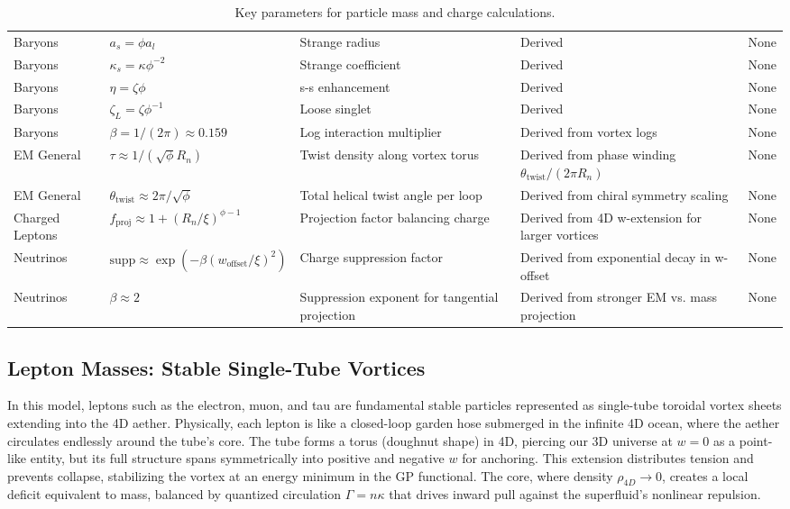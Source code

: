 \documentclass{article}
\begin{document}
\begin{sidewaystable}[p]
\begin{tabular}{|p{2cm}|p{3cm}|p{6cm}|p{6cm}|p{3cm}|}
Baryons & $a_s = \phi a_l$ & Strange radius & Derived & None \\
Baryons & $\kappa_s = \kappa \phi^{-2}$ & Strange coefficient & Derived & None \\
Baryons & $\eta = \zeta \phi$ & s-s enhancement & Derived & None \\
Baryons & $\zeta_L = \zeta \phi^{-1}$ & Loose singlet & Derived & None \\
Baryons & $\beta = 1/(2\pi) \approx 0.159$ & Log interaction multiplier & Derived from vortex logs & None \\
EM General & $\tau \approx 1 / (\sqrt{\phi} R_n)$ & Twist density along vortex torus & Derived from phase winding $\theta_{\text{twist}} / (2\pi R_n)$ & None \\
EM General & $\theta_{\text{twist}} \approx 2\pi / \sqrt{\phi}$ & Total helical twist angle per loop & Derived from chiral symmetry scaling & None \\
Charged Leptons & $f_{\text{proj}} \approx 1 + (R_n / \xi)^{\phi - 1}$ & Projection factor balancing charge & Derived from 4D w-extension for larger vortices & None \\
Neutrinos & $\text{supp} \approx \exp( - \beta (w_{\text{offset}} / \xi)^2 )$ & Charge suppression factor & Derived from exponential decay in w-offset & None \\
Neutrinos & $\beta \approx 2$ & Suppression exponent for tangential projection & Derived from stronger EM vs. mass projection & None \\
\hline
\end{tabular}
\caption{Key parameters for particle mass and charge calculations.}
\label{tab:variables}
\end{sidewaystable}

\subsection{Lepton Masses: Stable Single-Tube Vortices}

In this model, leptons such as the electron, muon, and tau are fundamental stable particles represented as single-tube toroidal vortex sheets extending into the 4D aether. Physically, each lepton is like a closed-loop garden hose submerged in the infinite 4D ocean, where the aether circulates endlessly around the tube's core. The tube forms a torus (doughnut shape) in 4D, piercing our 3D universe at $w=0$ as a point-like entity, but its full structure spans symmetrically into positive and negative $w$ for anchoring. This extension distributes tension and prevents collapse, stabilizing the vortex at an energy minimum in the GP functional. The core, where density $\rho_{4D} \to 0$, creates a local deficit equivalent to mass, balanced by quantized circulation $\Gamma = n \kappa$ that drives inward pull against the superfluid's nonlinear repulsion.
\end{document}
